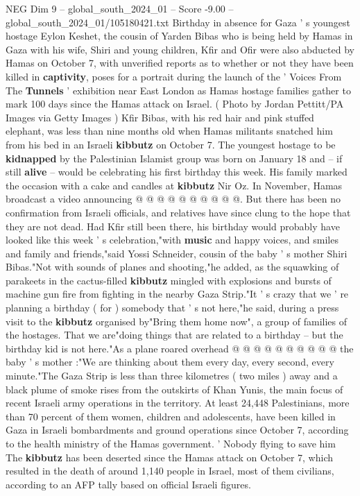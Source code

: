 \begin{textsample}{NEG Dim 9 – global\_south\_2024\_01 – Score -9.00 – global\_south\_2024\_01/105180421.txt}  \label{ex:f9_neg_421}
Birthday in absence for Gaza ' s youngest hostage Eylon Keshet, the cousin of Yarden Bibas who is being held by Hamas in Gaza with his wife, Shiri and young children, Kfir and Ofir were also abducted by Hamas on October 7, with unverified reports as to whether or not they have been killed in \textbf{captivity}, poses for a portrait during the launch of the ' Voices From The \textbf{Tunnels} ' exhibition near East London as Hamas hostage families gather to mark 100 days since the Hamas attack on Israel. ( Photo by Jordan Pettitt/PA Images via Getty Images ) Kfir Bibas, with his red hair and pink stuffed elephant, was less than nine months old when Hamas militants snatched him from his bed in an Israeli \textbf{kibbutz} on October 7.
The youngest hostage to be \textbf{kidnapped} by the Palestinian Islamist group was born on January 18 and -- if still \textbf{alive} -- would be celebrating his first birthday this week.
His family marked the occasion with a cake and candles at \textbf{kibbutz} Nir Oz.
In November, Hamas broadcast a video announcing @ @ @ @ @ @ @ @ @ @.
But there has been no confirmation from Israeli officials, and relatives have since clung to the hope that they are not dead.
Had Kfir still been there, his birthday would probably have looked like this week ' s celebration,"with \textbf{music} and happy voices, and smiles and family and friends,"said Yossi Schneider, cousin of the baby ' s mother Shiri Bibas."Not with sounds of planes and shooting,"he added, as the squawking of parakeets in the cactus-filled \textbf{kibbutz} mingled with explosions and bursts of machine gun fire from fighting in the nearby Gaza Strip."It ' s crazy that we ' re planning a birthday ( for ) somebody that ' s not here,"he said, during a press visit to the \textbf{kibbutz} organised by"Bring them home now", a group of families of the hostages.
That we are"doing things that are related to a birthday -- but the birthday kid is not here."As a plane roared overhead @ @ @ @ @ @ @ @ @ @ the baby ' s mother :"We are thinking about them every day, every second, every minute."The Gaza Strip is less than three kilometres ( two miles ) away and a black plume of smoke rises from the outskirts of Khan Yunis, the main focus of recent Israeli army operations in the territory.
At least 24,448 Palestinians, more than 70 percent of them women, children and adolescents, have been killed in Gaza in Israeli bombardments and ground operations since October 7, according to the health ministry of the Hamas government. ' Nobody flying to save him The \textbf{kibbutz} has been deserted since the Hamas attack on October 7, which resulted in the death of around 1,140 people in Israel, most of them civilians, according to an AFP tally based on official Israeli figures.

\end{textsample}
